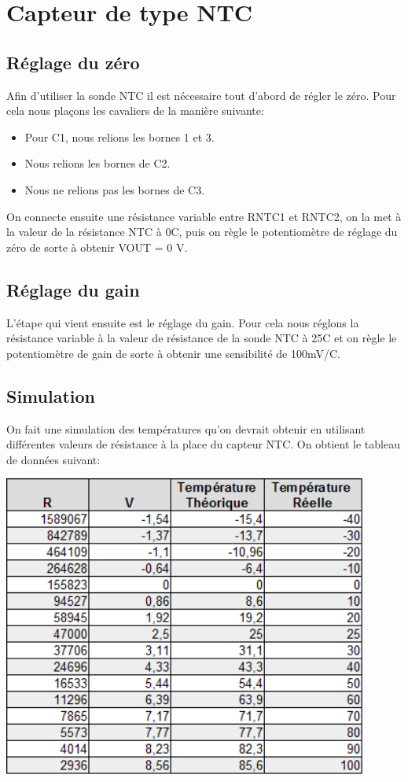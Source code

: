 \documentclass[a4paper,12pt]{article}
\begin{document}
  \section{Capteur de type NTC}
  		\subsection{Réglage du zéro}
			\par Afin d'utiliser la sonde NTC il est nécessaire tout d'abord de régler le zéro. Pour cela nous plaçons les cavaliers de la manière suivante:
      		\begin{itemize}
				\item Pour C1, nous relions les bornes 1 et 3.
				\item Nous relions les bornes de C2.
				\item Nous ne relions pas les bornes de C3.
			\end{itemize}
			\par On connecte ensuite une résistance variable entre RNTC1 et RNTC2, on la met à la valeur de la résistance NTC à 0{\degre}C, puis on règle le potentiomètre de réglage du zéro de sorte à obtenir VOUT = 0 V.

		\subsection{Réglage du gain}
			\par L'étape qui vient ensuite est le réglage du gain. Pour cela nous réglons la résistance variable à la valeur de résistance de la sonde NTC à 25{\degre}C et on règle le potentiomètre de gain de sorte à obtenir une sensibilité de 100mV/{\degre}C.

		\subsection{Simulation}
			\par On fait une simulation des températures qu'on devrait obtenir en utilisant différentes valeurs de résistance à la place du capteur NTC.
			On obtient le tableau de données suivant:
			\begin{center}
				\includegraphics[width=12cm]{../Images/TabNTC.png}
			\end{center}
\end{document}
